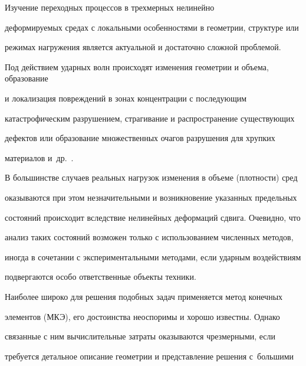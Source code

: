 







\makerutitle



\newpage



 Изучение переходных процессов в трехмерных нелинейно

деформируемых средах с локальными особенностями в геометрии, структуре или

режимах нагружения является актуальной и достаточно сложной проблемой. 

Под действием ударных волн происходят изменения геометрии и объема, образование

и локализация повреждений в зонах концентрации с последующим

катастрофическим разрушением, страгивание и распространение существующих

дефектов или образование множественных очагов разрушения для хрупких

материалов и~др.~\cite{petu:bib1}.



В большинстве случаев реальных нагрузок изменения в объеме (плотности) сред

оказываются при этом незначительными и возникновение указанных предельных

состояний происходит вследствие нелинейных деформаций сдвига. Очевидно, что

анализ таких состояний возможен только с использованием численных методов,

иногда в сочетании с экспериментальными методами, если ударным воздействиям

подвергаются особо ответственные объекты техники.



Наиболее широко для решения подобных задач применяется метод конечных

элементов (МКЭ), его достоинства неоспоримы и хорошо известны. Однако

связанные с ним вычислительные затраты оказываются чрезмерными, если

требуется детальное описание геометрии и представление решения с~большими

